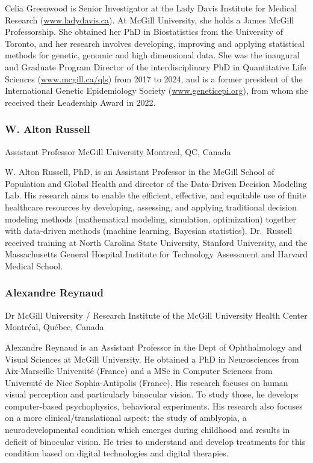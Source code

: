 \documentclass[
]{book}
\begin{document}
Celia Greenwood is Senior Investigator at the Lady Davis Institute for Medical Research (\url{www.ladydavis.ca}). At McGill University, she holds a James McGill Professorship. She obtained her PhD in Biostatistics from the University of Toronto, and her research involves developing, improving and applying statistical methods for genetic, genomic and high dimensional data. She was the inaugural and Graduate Program Director of the interdisciplinary PhD in Quantitative Life Sciences (\url{www.mcgill.ca/qls}) from 2017 to 2024, and is a former president of the International Genetic Epidemiology Society (\url{www.geneticepi.org}), from whom she received their Leadership Award in 2022.

\subsubsection{W. Alton Russell}\label{w.-alton-russell}

Assistant Professor
McGill University
Montreal, QC, Canada

W. Alton Russell, PhD, is an Assistant Professor in the McGill School of Population and Global Health and director of the Data-Driven Decision Modeling Lab. His research aims to enable the efficient, effective, and equitable use of finite healthcare resources by developing, assessing, and applying traditional decision modeling methods (mathematical modeling, simulation, optimization) together with data-driven methods (machine learning, Bayesian statistics). Dr.~Russell received training at North Carolina State University, Stanford University, and the Massachusetts General Hospital Institute for Technology Assessment and Harvard Medical School.

\subsubsection{Alexandre Reynaud}\label{alexandre-reynaud}

Dr
McGill University / Research Institute of the McGill University Health Center
Montréal, Québec, Canada

Alexandre Reynaud is an Assistant Professor in the Dept of Ophthalmology and Visual Sciences at McGill University. He obtained a PhD in Neurosciences from Aix-Marseille Université (France) and a MSc in Computer Sciences from Université de Nice Sophia-Antipolis (France). His research focuses on human visual perception and particularly binocular vision. To study those, he develops computer-based psychophysics, behavioral experiments. His research also focuses on a more clinical/translational aspect: the study of amblyopia, a neurodevelopmental condition which emerges during childhood and results in deficit of binocular vision. He tries to understand and develop treatments for this condition based on digital technologies and digital therapies.
\end{document}
